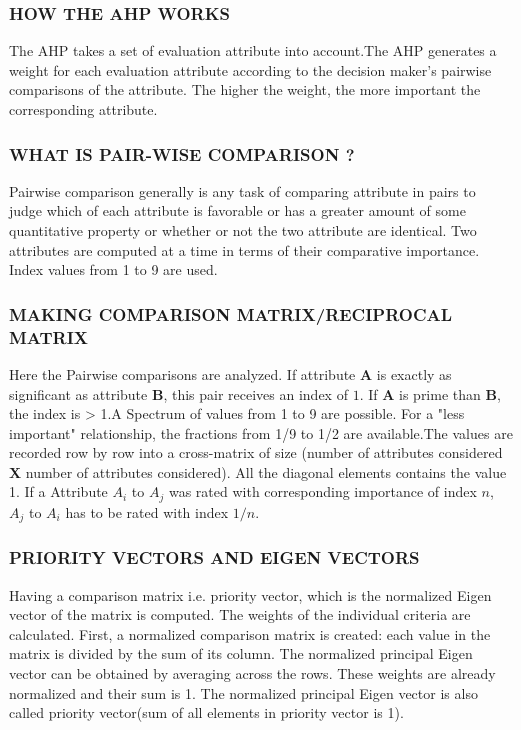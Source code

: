 \documentclass[12pt,oneside]{book}
\begin{document}
\subsubsection{HOW THE AHP WORKS}
The AHP  takes a set of evaluation attribute into account.The AHP generates a weight for each evaluation attribute according to the decision maker's pairwise comparisons of the attribute. The higher the weight, the more important the corresponding attribute.
\subsubsection{WHAT IS PAIR-WISE COMPARISON ?}
Pairwise comparison generally is any task of comparing attribute in pairs to judge which of each attribute is favorable or has a greater amount of some quantitative property or whether or not the two attribute are identical. Two attributes  are computed at a time in terms of their comparative importance. Index values from 1 to 9 are used.
\subsubsection{MAKING COMPARISON MATRIX/RECIPROCAL MATRIX}
Here the Pairwise comparisons are analyzed. If attribute \textbf{A} is exactly as significant as attribute \textbf{B}, this pair receives an index of $1$. If \textbf{A} is prime than \textbf{B}, the index is > 1.A Spectrum of values from 1 to 9 are possible.  For a "less important" relationship, the fractions from 1/9 to 1/2 are available.The values are recorded row by row into a cross-matrix of size (number of attributes considered  \textbf{X} number of attributes considered). All the diagonal elements contains the value 1. If a Attribute $A_i$  to $A_j$  was rated with corresponding importance of index $n$, $A_j$  to  $A_i$  has to be rated with index $1/n$. 
\subsubsection{PRIORITY VECTORS AND EIGEN VECTORS}
Having a comparison matrix i.e.  priority vector, which is the normalized Eigen vector of the matrix is computed.
 The weights of the individual criteria are calculated. First, a normalized comparison matrix is created: each value in the matrix is divided by the sum of its column. The normalized principal Eigen vector can be obtained by averaging across the rows. These weights are already normalized and their sum is 1. The normalized principal Eigen vector is also called priority vector(sum of all elements in priority vector is 1). 
\end{document}
